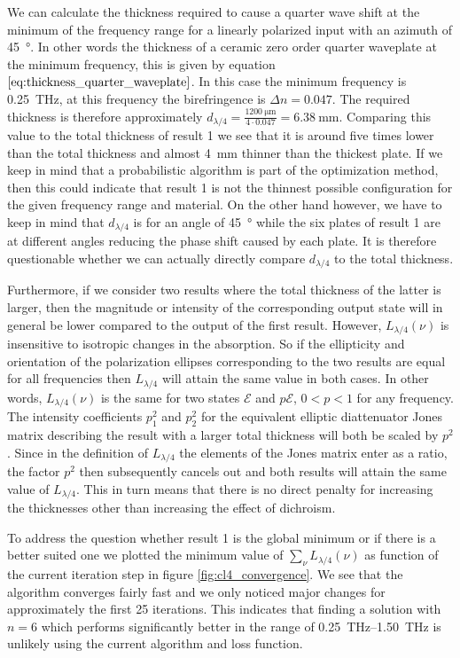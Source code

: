 We can calculate the thickness required to cause a quarter wave shift at the minimum of the frequency range for a linearly polarized input with an azimuth of \SI{45}{\degree}. In other words the thickness of a ceramic zero order quarter waveplate at the minimum frequency, this is given by equation $\ref{eq:thickness_quarter_waveplate}$. In this case the minimum frequency is \SI{0.25}{\tera \hertz}, at this frequency the birefringence is $\Delta n = 0.047$. The required thickness is therefore approximately $d_{\lambda/4}=\frac{\SI{1200}{\micro \meter}}{4\cdot0.047}=\SI{6.38}{\milli \meter}$. Comparing this value to the total thickness of result 1 we see that it is around five times lower than the total thickness and almost \SI{4}{\milli \meter} thinner than the thickest plate. If we keep in mind that a probabilistic algorithm is part of the optimization method, then this could indicate that result 1 is not the thinnest possible configuration for the given frequency range and material. On the other hand however, we have to keep in mind that $d_{\lambda/4}$ is for an angle of \SI{45}{\degree} while the six plates of result 1 are at different angles reducing the phase shift caused by each plate. It is therefore questionable whether we can actually directly compare $d_{\lambda/4}$ to the total thickness. 

Furthermore, if we consider two results where the total thickness of the latter is larger, then the magnitude or intensity of the corresponding output state will in general be lower compared to the output of the first result. However, $L_{\lambda/4}(\nu)$ is insensitive to isotropic changes in the absorption. So if the ellipticity and orientation of the polarization ellipses corresponding to the two results are equal for all frequencies then $L_{\lambda/4}$ will attain the same value in both cases. In other words, $L_{\lambda/4}(\nu)$ is the same for two states $\bm{\mathcal{E}}$ and $p\bm{\mathcal{E}}$, $0<p<1$ for any frequency. The intensity coefficients $p_1^2$ and $p_2^2$ for the equivalent elliptic diattenuator Jones matrix describing the result with a larger total thickness will both be scaled by $p^2$. Since in the definition of $L_{\lambda/4}$ the elements of the Jones matrix enter as a ratio, the factor $p^2$ then subsequently cancels out and both results will attain the same value of $L_{\lambda/4}$. This in turn means that there is no direct penalty for increasing the thicknesses other than increasing the effect of dichroism.

To address the question whether result 1 is the global minimum or if there is a better suited one we plotted the minimum value of $\sum_{\nu}L_{\lambda/4}(\nu)$ as function of the current iteration step in figure  \ref{fig:cl4_convergence}. We see that the algorithm converges fairly fast and we only noticed major changes for approximately the first 25 iterations. This indicates that finding a solution with $n=6$ which performs significantly better in the range of \SIrange{0.25}{1.50}{\tera \hertz} is unlikely using the current algorithm and loss function.

